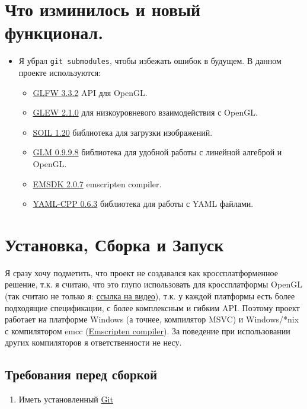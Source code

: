 \documentclass[12pt]{article}
\begin{document}
    \section{Что изминилось и новый функционал.}
    \label{sec:fickle}
    \begin{itemize}
      \item Я убрал \colorbox{gray!25!}{\texttt{git submodules}}, чтобы 
      избежать ошибок в будущем. В данном проекте используются:
      \begin{itemize}
        \item \href{https://github.com/glfw/glfw/releases/tag/3.3.2}{GLFW 3.3.2} API для OpenGL.
        \item \href{https://github.com/nigels-com/glew/releases/tag/glew-2.1.0}{GLEW 2.1.0} для низкоуровневого взаимодействия с OpenGL.
        \item \href{https://github.com/SpartanJ/SOIL2/releases/tag/release-1.20}{SOIL 1.20} библиотека для загрузки изображений.
        \item \href{https://github.com/g-truc/glm/releases/tag/0.9.9.8}{GLM 0.9.9.8} библиотека для удобной работы с линейной алгеброй и OpenGL.
        \item \href{https://github.com/emscripten-core/emsdk/releases/tag/2.0.7}{EMSDK 2.0.7} emscripten compiler.
        \item \href{https://github.com/jbeder/yaml-cpp/releases/tag/yaml-cpp-0.6.3}{YAML-CPP 0.6.3} библиотека для работы с YAML файлами.
      \end{itemize}
    \end{itemize}
    \newpage
    \section{Установка, Сборка и Запуск}
    Я сразу хочу подметить, что проект не создавался как кроссплатформенное
    решение, т.к. я считаю, что это глупо использовать для кроссплатформы
    OpenGL (так считаю не только я: \href{https://www.youtube.com/watch?v=W3gAzLwfIP0}{ссылка на видео}), т.к. у каждой платформы есть более подходящие спецификации, с 
    более комплексным и гибким API. Поэтому проект работает на
    платформе Windows (а точнее, компилятор MSVC) и Windows/*nix 
    с компилятором emcc (\href{https://emscripten.org/}{Emscripten compiler}).
    За поведение при использовании других компиляторов я ответственности не 
    несу.
    \subsection{Требования перед сборкой}
    \label{sec:pre_req}
    \begin{enumerate}
      \item Иметь установленный \href{https://git-scm.com/}{Git}
    \end{enumerate}
\end{document}
